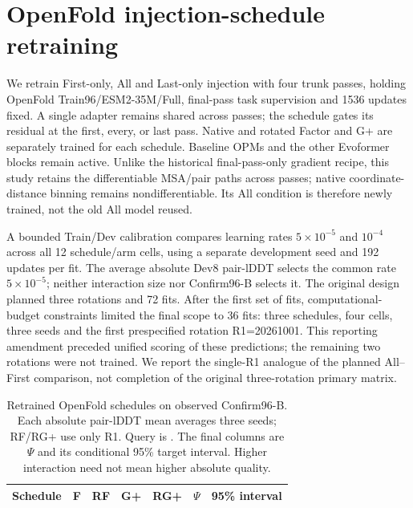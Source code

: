 \section{OpenFold injection-schedule retraining}
\label{app:schedule_retraining}
We retrain First-only, All and Last-only injection with four trunk passes,
holding OpenFold Train96/ESM2-35M/Full, final-pass task supervision and 1536
updates fixed. A single adapter remains shared across passes; the schedule
gates its residual at the first, every, or last pass. Native and rotated
Factor and G+ are separately trained for each schedule. Baseline OPMs and the
other Evoformer blocks remain active. Unlike the historical final-pass-only
gradient recipe, this study retains the differentiable MSA/pair paths across
passes; native coordinate-distance binning remains nondifferentiable. Its All
condition is therefore newly trained, not the old All model reused.

A bounded Train/Dev calibration compares learning rates $5\times10^{-5}$ and
$10^{-4}$ across all 12 schedule/arm cells, using a separate development seed
and 192 updates per fit. The average absolute Dev8 pair-lDDT selects the common
rate $5\times10^{-5}$; neither interaction size nor Confirm96-B selects it.
The original design planned three rotations and 72 fits. After the first set
of fits, computational-budget constraints limited the final scope to
36 fits: three schedules, four cells, three seeds and the first prespecified
rotation R1=20261001. This reporting amendment preceded unified scoring of
these predictions; the remaining two rotations were not trained. We report
the single-R1 analogue of the planned All--First comparison, not completion
of the original three-rotation primary matrix.

\begin{table}[!htbp]\centering\small
\caption{Retrained OpenFold schedules on observed Confirm96-B. Each absolute
pair-lDDT mean averages three seeds; RF/RG+ use only R1. Query is
. The final columns are $\Psi$ and its conditional
95\% target interval. Higher interaction need not mean higher absolute quality.}
\label{tab:schedule_means}
\setlength{\tabcolsep}{4pt}
\begin{tabular}{lrrrrrr}\toprule
Schedule & F & RF & G+ & RG+ & $\Psi$ & 95\% interval \\\midrule

\end{tabular}\end{table}

